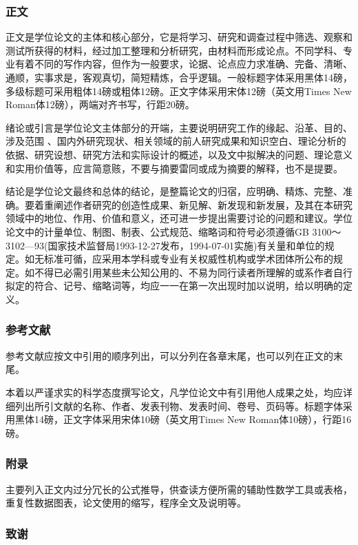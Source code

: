 \subsubsection{正文}

正文是学位论文的主体和核心部分，它是将学习、研究和调查过程中筛选、观察和测试所获得的材料，经过加工整理和分析研究，由材料而形成论点。不同学科、专业有着不同的写作内容，但作为一般要求，论据、论点应力求准确、完备、清晰、通顺，实事求是，客观真切，简短精炼，合乎逻辑。一般标题字体采用黑体14磅，多级标题可采用粗体14磅或粗体12磅。正文字体采用宋体12磅（英文用Times New Roman体12磅），两端对齐书写，行距20磅。


绪论或引言是学位论文主体部分的开端，主要说明研究工作的缘起、沿革、目的、涉及范围 、国内外研究现状、相关领域的前人研究成果和知识空白、理论分析的依据、研究设想、研究方法和实际设计的概述，以及文中拟解决的问题、理论意义和实用价值等，应言简意赅，不要与摘要雷同或成为摘要的解释，也不是提要。

结论是学位论文最终和总体的结论，是整篇论文的归宿，应明确、精炼、完整、准确。要着重阐述作者研究的创造性成果、新见解、新发现和新发展，及其在本研究领域中的地位、作用、价值和意义，还可进一步提出需要讨论的问题和建议。学位论文中的计量单位、制图、制表、公式规范、缩略词和符号必须遵循GB 3100～3102—93(国家技术监督局1993-12-27发布，1994-07-01实施)有关量和单位的规定。如无标准可循，应采用本学科或专业有关权威性机构或学术团体所公布的规定。如不得已必需引用某些未公知公用的、不易为同行读者所理解的或系作者自行拟定的符合、记号、缩略词等，均应一一在第一次出现时加以说明，给以明确的定义。

\subsubsection{参考文献}

参考文献应按文中引用的顺序列出，可以分列在各章末尾，也可以列在正文的末尾。

本着以严谨求实的科学态度撰写论文，凡学位论文中有引用他人成果之处，均应详细列出所引文献的名称、作者、发表刊物、发表时间、卷号、页码等。标题字体采用黑体14磅，正文字体采用宋体10磅（英文用Times New Roman体10磅），行距16磅。

\subsubsection{附录}
主要列入正文内过分冗长的公式推导，供查读方便所需的辅助性数学工具或表格，重复性数据图表，论文使用的缩写，程序全文及说明等。

\subsubsection{致谢}

